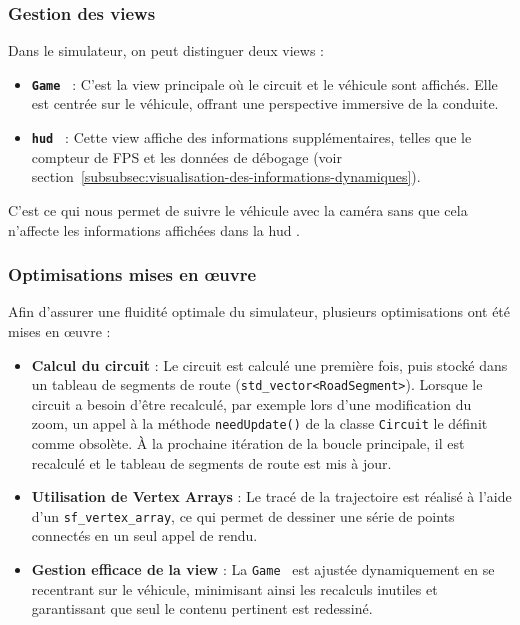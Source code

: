 \subsubsection{Gestion des \glspl{view}}\label{subsubsec:gestion-des-vues}
Dans le simulateur, on peut distinguer deux \glspl{view} :
\begin{itemize}
    \item \textbf{\texttt{Game }} : C'est la \gls{view} principale où le circuit et le véhicule sont affichés.
    Elle est centrée sur le véhicule, offrant une perspective immersive de la conduite.
    \item \textbf{\texttt{\gls{hud} }} : Cette \gls{view} affiche des informations supplémentaires, telles que le compteur de FPS et les données de débogage (voir section~\ref{subsubsec:visualisation-des-informations-dynamiques}).
\end{itemize}

C'est ce qui nous permet de suivre le véhicule avec la \og caméra \fg{} sans que cela n'affecte les informations affichées dans la \gls{hud} .

\subsubsection{Optimisations mises en œuvre}\label{subsubsec:optimisations-mises-en-oeuvre}
Afin d'assurer une fluidité optimale du simulateur, plusieurs optimisations ont été mises en œuvre :
\begin{itemize}
    \item \textbf{Calcul du circuit} : Le circuit est calculé une première fois, puis stocké dans un tableau de segments de route (\texttt{\gls{std_vector}<RoadSegment>}\cite{cpp_reference_vector}).
    Lorsque le circuit a besoin d'être recalculé, par exemple lors d'une modification du zoom, un appel à la méthode \texttt{needUpdate()} de la classe \texttt{Circuit} le définit comme obsolète.
    À la prochaine itération de la boucle principale, il est recalculé et le tableau de segments de route est mis à jour.
    \item \textbf{Utilisation de Vertex Arrays} : Le tracé de la trajectoire est réalisé à l'aide d'un \texttt{\gls{sf_vertex_array}}\cite{sfml_sf_vertexarray}, ce qui permet de dessiner une série de points connectés en un seul appel de rendu.
    \item \textbf{Gestion efficace de la \gls{view}} : La \texttt{Game } est ajustée dynamiquement en se recentrant sur le véhicule, minimisant ainsi les recalculs inutiles et garantissant que seul le contenu pertinent est redessiné.
\end{itemize}

